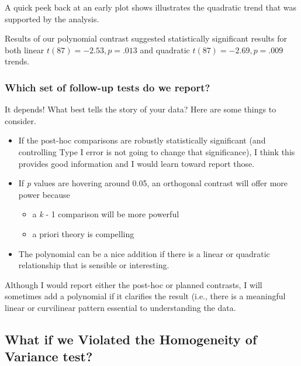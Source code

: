 \documentclass[
  english,
]{book}
\providecommand{\tightlist}{%
  \setlength{\itemsep}{0pt}\setlength{\parskip}{0pt}}
\begin{document}
A quick peek back at an early plot shows illustrates the quadratic trend that was supported by the analysis.

Results of our polynomial contrast suggested statistically significant results for both linear \(t(87) = -2.53, p = .013\) and quadratic \(t(87) = -2.69, p = .009\) trends.

\hypertarget{which-set-of-follow-up-tests-do-we-report}{%
\subsubsection{Which set of follow-up tests do we report?}\label{which-set-of-follow-up-tests-do-we-report}}

It depends! What best tells the story of your data? Here are some things to consider.

\begin{itemize}
\tightlist
\item
  If the post-hoc comparisons are robustly statistically significant (and controlling Type I error is not going to change that significance), I think this provides good information and I would learn toward report those.
\item
  If \emph{p} values are hovering around 0.05, an orthogonal contrast will offer more power because

  \begin{itemize}
  \tightlist
  \item
    a \emph{k} - 1 comparison will be more powerful
  \item
    a priori theory is compelling
  \end{itemize}
\item
  The polynomial can be a nice addition if there is a linear or quadratic relationship that is sensible or interesting.
\end{itemize}

Although I would report either the post-hoc or planned contrasts, I will sometimes add a polynomial if it clarifies the result (i.e., there is a meaningful linear or curvilinear pattern essential to understanding the data.

\hypertarget{what-if-we-violated-the-homogeneity-of-variance-test}{%
\subsection{What if we Violated the Homogeneity of Variance test?}\label{what-if-we-violated-the-homogeneity-of-variance-test}}
\end{document}
